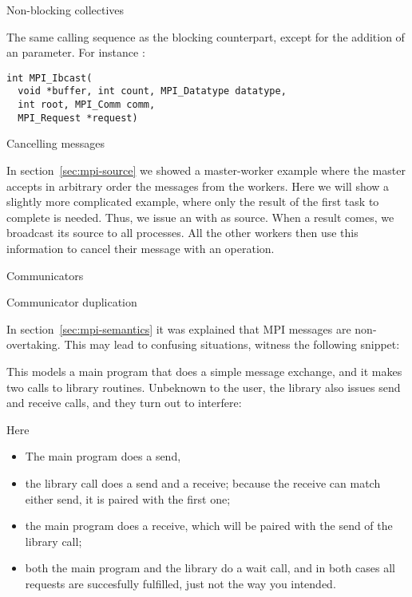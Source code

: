  {Non-blocking collectives}

The same calling sequence as the blocking counterpart, except for the addition
of an  parameter. For instance 
:
\begin{verbatim}
int MPI_Ibcast(
  void *buffer, int count, MPI_Datatype datatype,
  int root, MPI_Comm comm, 
  MPI_Request *request)
\end{verbatim}

 {Cancelling messages}

In section~\ref{sec:mpi-source} we showed a master-worker example where the 
master accepts in arbitrary order the messages from the workers.
Here we will show a slightly
more complicated example, where only the result of the first task to
complete is needed. Thus, we issue an 
with  as source.  When a result comes, we
broadcast its source to all processes.  All the other workers then use
this information to cancel their message with
an  operation.


 {Communicators}

 {Communicator duplication}

In section~\ref{sec:mpi-semantics} it was explained that MPI messages are 
non-overtaking. This may lead to confusing situations, witness the following snippet:


This models a main program that does a simple message exchange, and it
makes two calls to library routines. Unbeknown to the user, the library also issues send and receive calls, and they turn out to interfere:


Here
\begin{itemize}
\item The main program does a send,
\item the library call  does a send and a receive;
  because the receive can match either send, it is paired with the
  first one;
\item the main program does a receive, which will be paired with the send of the 
  library call;
\item both the main program and the library do a wait call, and in
  both cases all requests are succesfully fulfilled, just not the way
  you intended.
\end{itemize}

